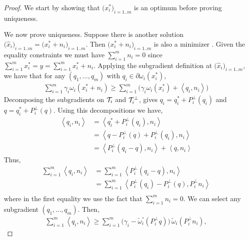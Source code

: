 \documentclass{article}
\begin{document}
\begin{proof}
We start by showing that $\big(x_{i}^*\big)_{i=1..m}$ is an optimum before proving uniqueness.

We now prove uniqueness. Suppose there is another solution $\big(\hat{x}_{i}\big)_{i=1..m}=\big({x}_{i}^*+n_i\big)_{i=1..m}$. Then  $\big({x}_{i}^*+n_i\big)_{i=1..m}$ is also a minimizer . Given the equality constraints we must have $\sum_{i=1}^{m}n_i=0$ since $\sum_{i=1}^{m}{x}_{i}^*=y=\sum_{i=1}^{m}{x}_{i}^*+n_i$. Applying the subgradient definition at $\big(\hat{x}_{i}\big)_{i=1..m}$, we have that for any $(q_1,...,q_m)$  with $q_i \in \partial \omega_i(x_i^*)$, 
\begin{align*}
\sum_{i=1}^{m} \gamma_i \omega_i(x_i^*+n_i) \geq \sum_{i=1}^{m}\big(\gamma_i \omega_i(x_i^*) + \left\langle q_i,n_i\right\rangle\big)
\end{align*}
Decomposing the subgradients on $\mathcal{T}_i$ and $\mathcal{T}_i^{\perp}$, gives $q_i=q_i^* + P_i^{\perp}(q_i)$ and  $q=q_i^* + P_i^{\perp}(q)$. Using this decompositions we have,
\begin{align*}
\left\langle q_i,n_i\right\rangle &= \left\langle q_i^* + P_i^{\perp}(q_i),n_i\right\rangle\\
&= \left\langle q - P_i^{\perp}(q)+ P_i^{\perp}(q_i),n_i\right\rangle\\
&= \left\langle P_i^{\perp}(q_i- q),n_i\right\rangle + \left\langle q,n_i\right\rangle
\end{align*}
Thus,
\begin{align*}
\sum_{i=1}^{m}\left\langle q_i,n_i\right\rangle &=\sum_{i=1}^{m}\left\langle P_i^{\perp}(q_i-q),n_i\right\rangle \\
&=\sum_{i=1}^{m}\left\langle P_i^{\perp}(q_i)-P_i^{\perp}(q),P_i^{\perp}n_i\right\rangle \\
\end{align*}
where in the first equality we use the fact that $\sum_{i=1}^{m} n_i=0$. We can select any subgradient $(q_1,...,q_m)$.  
Then,
\begin{align}
\label{unineq}
\sum_{i=1}^{m}\left\langle q_i,n_i\right\rangle \geq\sum_{i=1}^{m}\big(\gamma_i-\widetilde{\omega}_i^{\circ}(P_i^{\perp}q)\big)\, \widetilde{\omega}_i(P_i^{\perp}n_i),

\end{align}
\end{proof}
\end{document}
